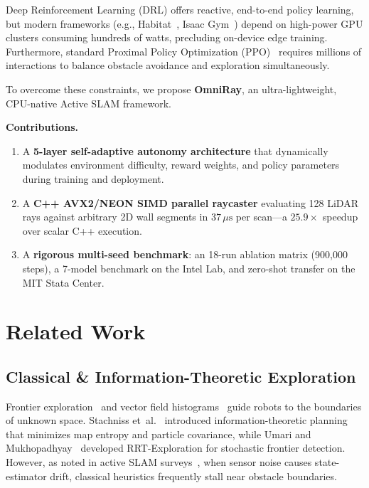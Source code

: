 \documentclass[conference]{IEEEtran}
\begin{document}
Deep Reinforcement Learning (DRL) offers reactive, end-to-end policy learning, but modern frameworks (e.g., Habitat~\cite{savva2019}, Isaac Gym~\cite{makoviychuk2021}) depend on high-power GPU clusters consuming hundreds of watts, precluding on-device edge training. Furthermore, standard Proximal Policy Optimization (PPO)~\cite{schulman2017} requires millions of interactions to balance obstacle avoidance and exploration simultaneously.

To overcome these constraints, we propose \textbf{OmniRay}, an ultra-lightweight, CPU-native Active SLAM framework.

\noindent\textbf{Contributions.}
\begin{enumerate}
    \item A \textbf{5-layer self-adaptive autonomy architecture} that dynamically modulates environment difficulty, reward weights, and policy parameters during training and deployment.
    \item A \textbf{C++ AVX2/NEON SIMD parallel raycaster} evaluating 128 LiDAR rays against arbitrary 2D wall segments in $37\,\mu\text{s}$ per scan---a $25.9\times$ speedup over scalar C++ execution.
    \item A \textbf{rigorous multi-seed benchmark}: an 18-run ablation matrix (900{,}000 steps), a 7-model benchmark on the Intel Lab, and zero-shot transfer on the MIT Stata Center.
\end{enumerate}

\section{Related Work}

\subsection{Classical \& Information-Theoretic Exploration}
Frontier exploration~\cite{yamauchi1997} and vector field histograms~\cite{borenstein1991} guide robots to the boundaries of unknown space. Stachniss et~al.~\cite{stachniss2005} introduced information-theoretic planning that minimizes map entropy and particle covariance, while Umari and Mukhopadhyay~\cite{umari2017} developed RRT-Exploration for stochastic frontier detection. However, as noted in active SLAM surveys~\cite{cadena2016,placed2023}, when sensor noise causes state-estimator drift, classical heuristics frequently stall near obstacle boundaries.
\end{document}
